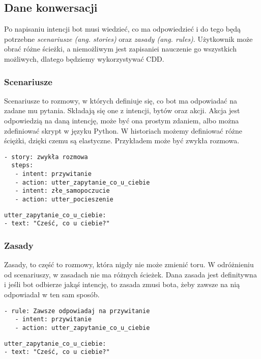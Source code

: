 \documentclass{article}
\begin{document}
\subsection{Dane konwersacji}
Po napisaniu intencji bot musi wiedzieć, co ma odpowiedzieć i do tego będą
potrzebne \emph{scenariusze (ang. stories)} oraz \emph{zasady (ang. rules)}.
Użytkownik może obrać różne ścieżki, a niemożliwym jest zapisaniei
nauczenie go wszystkich możliwych, dlatego będziemy wykorzystywać CDD.

\subsubsection{Scenariusze}
Scenariusze to rozmowy, w których definiuje się, co bot ma odpowiadać na zadane
mu pytania. Składają się one z intencji, bytów oraz akcji. Akcja jest
odpowiedzią na daną intencję, może być ona prostym zdaniem, albo można
zdefiniować skrypt w języku Python. W historiach możemy definiować różne
ściężki, dzięki czemu są elastyczne. Przykładem może być zwykła rozmowa.

\begin{lstlisting}[caption=Przykładowa historia]
- story: zwykła rozmowa
  steps:
   - intent: przywitanie
   - action: utter_zapytanie_co_u_ciebie
   - intent: złe_samopoczucie
   - action: utter_pocieszenie
\end{lstlisting}

\begin{lstlisting}[caption= Jak zdefiniowane są odpowiedzi]
utter_zapytanie_co_u_ciebie:
- text: "Cześć, co u ciebie?"
\end{lstlisting}

\subsubsection{Zasady}
Zasady, to część to rozmowy, która nigdy nie może zmienić toru. W odróżnieniu
od scenariuszy, w zasadach nie ma różnych ścieżek. Dana zasada jest definitywna
i jeśli bot odbierze jakąś intencję, to zasada zmusi bota, żeby zawsze na nią
odpowiadał w ten sam sposób.

\begin{lstlisting}[caption=Przykładowa zasada]
- rule: Zawsze odpowiadaj na przywitanie
   - intent: przywitanie
   - action: utter_zapytanie_co_u_ciebie
\end{lstlisting}

\begin{lstlisting}[caption= Jak zdefiniowane są odpowiedzi]
utter_zapytanie_co_u_ciebie:
- text: "Cześć, co u ciebie?"
\end{lstlisting}
\end{document}

